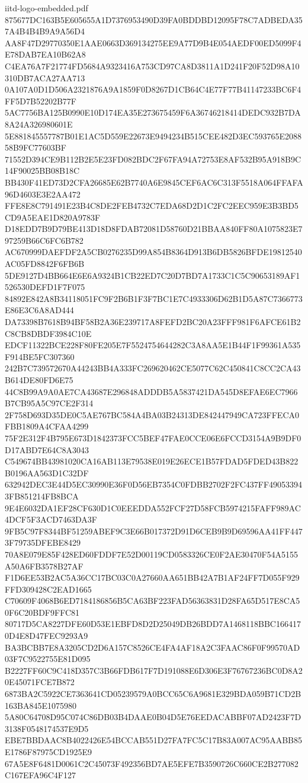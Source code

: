 \begin{filecontents*}[overwrite]{iitd-logo-embedded.pdf}
875677DC163B5E605655A1D7376953490D39FA0BDDBD12095F78C7ADBEDA357A4B4B4B9A9A56D4
AA8F47D29770350E1AAE0663D369134275EE9A77D9B4E054AEDF00ED5099F4E78DAB7EA10B62A8
C4EA76A7F21774FD5684A9323416A753CD97CA8D3811A1D241F20F52D98A10310DB7ACA27AA713
0A107A0D1D506A2321876A9A1859F0D8267D1CB64C4E77F77B41147233BC6F4FF5D7B52202B77F
5AC7756BA125B0990E10D174EA35E273675459F6A36746218414DEDC932B7DA8A24A326980601E
5E881845557787B01E1AC5D559E22673E9494234B515CEE482D3EC593765E208858B9FC77603BF
71552D394CE9B112B2E5E23FD082BDC2F67FA94A72753E8AF532B95A918B9C14F90025BB08B18C
BB430F41ED73D2CFA26685E62B7740A6E9845CEF6AC6C313F5518A064FFAFA96D4603E3E2AA472
FFE8E8C791491E23B4C8DE2FEB4732C7EDA68D2D1C2FC2EEC959E3B3BD5CD9A5EAE1D820A9783F
D18EDD7B9D79BE413D18D8FDAB72081D58760D21BBAA840FF80A1075823E797259B66C6FC6B782
AC670999DAEFDF2A5CB0276235D99A854B8364D913B6DB5826BFDE19812540AC05FD8842F6FB6B
5DE9127D4BB664E6E6A9324B1CB22ED7C20D7BD7A1733C1C5C90653189AF1526530DEFD1F7F075
84892E842A8B34118051FC9F2B6B1F3F7BC1E7C4933306D62B1D5A87C7366773E86E3C6A8AD444
DA73398B7618B94BF58B2A36E239717A8FEFD2BC20A23FFF981F6AFCE61B2C8CB8DBDF3984C10E
EDCF11322BCE228F80FE205E7F5524754644282C3A8AA5E1B44F1F99361A535F914BE5FC307360
242B7C739572670A44243BB4A333FC269620462CE5077C62C450841C8CC2CA43B614DE80FD6E75
44C8B99A9A0AE7CA43687E296848ADDDB5A5837421DA545D8EFAE6EC7966B7CB95A5C97CE2F314
2F758D693D35DE0C5AE767BC584A4BA03B24313DE842447949CA723FFECA0FBB1809A4CFAA4299
75F2E312F4B795E673D1842373FCC5BEF47FAE0CCE06E6FCCD3154A9B9DF0D17ABD7E64C8A3043
C549674BB43981020CA16AB113E79538E019E26ECE1B57FDAD5FDED43B822B0196AA563D1C32DF
632942DEC3E44D5EC30990E36F0D56EB7354C0FDBB2702F2FC437FF490533943FB851214FB8BCA
9E4E6032DA1EF28CF630D1C0EEEDDA552FCF27D58FCB5974215FAFF989AC4DCF5F3ACD7463DA3F
9FB5C97F8344BF51259ABEF9C3E66B017372D91D6CEB9B9D69596AA41FF4473F79735DFEBE8429
70A8E079E85F428ED60FDDF7E52D00119CD0583326CE0F2AE30470F54A5155A50A6FB3578B27AF
F1D6EE53B2AC5A36CC17BC03C0A27660AA651BB42A7B1AF24FF7D055F929FFD309428C2EAD1665
C70609F4068B6ED7184186856B5CA63BF223FAD56363831D28FA65D517E8CA50F6C20BDF9FFC81
80717D5CA8227DFE60D53E1EBFD8D2D25049DB26BDD7A1468118BBC1664170D4E8D47FEC9293A9
BA3BCBB7E8A3205CD2D6A157C8526CE4FA4AF18A2C3FAAC86F0F99570AD03F7C9522755E81D095
B2227FF60C9C418D357C3B66FDB617F7D191088E6D306E3F76767236BC0D8A20E45071FCE7B872
6873BA2C5922CE7363641CD05239579A0BCC65C6A9681E329BDA059B71CD2B163BA845E1075980
5A80C64708D95C074C86DB03B4DAAE0B04D5E76EEDACABBF07AD2423F7D3138F0548174537E9D5
EBE7BBDAAC8B4022426E54BCCAB551D27FA7FC5C17B83A007AC95AABB85E1786F87975CD1925E9
67A5E8F6481D0061C2C45073F492356BD7AE5EFE7B3590726C660CE2B277082C167EFA96C4F127

\end{filecontents*}
